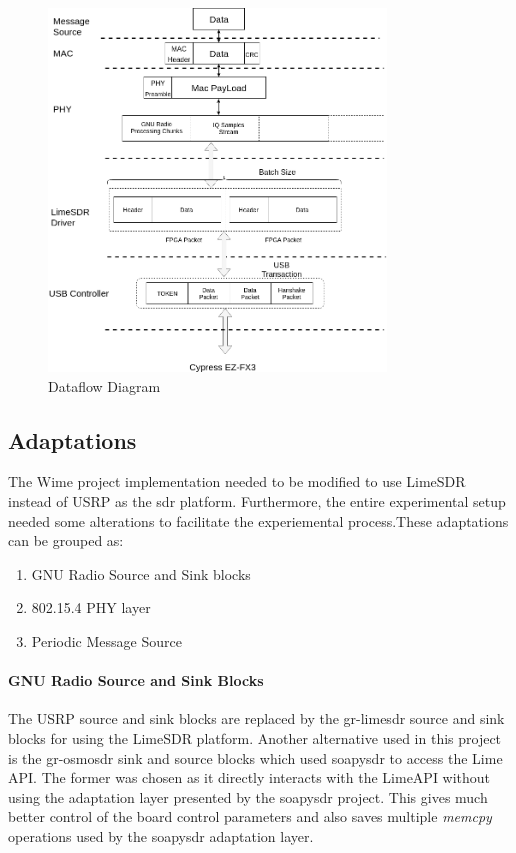 \begin{figure}[h!]
\centering
\includegraphics[width=0.8\textwidth]{Thesis/Figure/Dataflow.png}
\caption{Dataflow Diagram}
\label{Dataflow}
\end{figure}


\subsection{Adaptations}
The Wime project implementation needed to be modified to use LimeSDR instead of USRP as the \ac{sdr} platform.
Furthermore, the entire experimental setup needed some alterations to facilitate the experiemental process.These adaptations can be grouped as:

\begin{enumerate}
\item{GNU Radio Source and Sink blocks}
\item{802.15.4 \ac{PHY} layer}
\item{Periodic Message Source}
\end{enumerate}

\paragraph{GNU Radio Source and Sink Blocks}
The USRP source and sink blocks are replaced by the gr-limesdr source and sink blocks for using the LimeSDR platform.
Another alternative used in this project is the gr-osmosdr sink and source blocks which used soapysdr to access the Lime API. The former was chosen as it directly interacts with the LimeAPI without using the adaptation layer presented by the soapysdr project. This gives much better control of the board control parameters and also saves multiple \textit{memcpy} operations used by the soapysdr adaptation layer.\\

